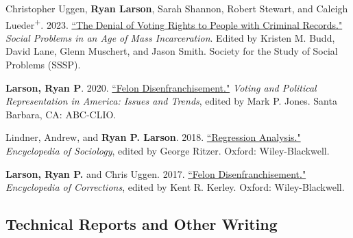 \documentclass[letterpaper]{article}
\renewenvironment{itemize}{
  \begin{list}{}{
    \setlength{\leftmargin}{1.5em}
  }
}{
  \end{list}
}
\begin{document}
\begin{itemize}

\item Christopher Uggen, \textbf{Ryan Larson}, Sarah Shannon, Robert Stewart, and Caleigh Lueder\textsuperscript{+}. 2023. \href{https://ryanplarson.github.io/personal_site/pubs/uggen_etal_23.pdf}{``The Denial of Voting Rights to People with Criminal Records."} \textit{Social Problems in an Age of Mass Incarceration}. Edited by Kristen M. Budd, David Lane, Glenn Muschert, and Jason Smith. Society for the Study of Social Problems (SSSP).

\item \textbf{Larson, Ryan P}. 2020. \href{https://ryanplarson.github.io/personal_site/pubs/larson_19.pdf}{``Felon Disenfranchisement."} \textit{Voting and Political Representation in America: Issues and Trends}, edited by Mark P. Jones. Santa Barbara, CA: ABC-CLIO.

\item Lindner, Andrew, and \textbf{Ryan P. Larson}. 2018. \href{https://ryanplarson.github.io/personal_site/pubs/lindner_larson_18.pdf}{``Regression Analysis."} \textit{Encyclopedia of Sociology}, edited by George Ritzer. Oxford: Wiley-Blackwell.

\item \textbf{Larson, Ryan P.} and Chris Uggen. 2017. \href{https://ryanplarson.github.io/personal_site/pubs/uggen_larson_17.pdf}{``Felon Disenfranchisement."} \textit{Encyclopedia of Corrections}, edited by Kent R. Kerley. Oxford: Wiley-Blackwell.

\end{itemize}


\subsection*{Technical Reports and Other Writing}
\end{document}
